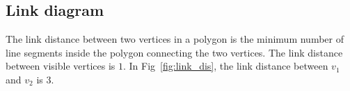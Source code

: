 \documentclass[]{styles/svproc}  %
\begin{document}
%    





\subsection{Link diagram}

The link distance between two vertices in a polygon is the minimum number of line segments inside the polygon connecting the two vertices. The link distance between visible vertices is $1$. In Fig~\ref{fig:link_dis}, the link distance between $v_1$ and $v_2$ is 3.
\end{document}
